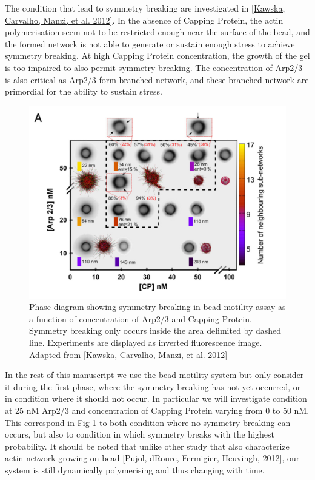 \documentclass[A4paperpaper,11pt,english]{sphinxmanual}
\begin{document}
The condition that lead to symmetry breaking are investigated in
{\hyperref[parts/part1:kawska2012]{{[}Kawska, Carvalho, Manzi,  et al.  2012{]}}}. In the absence of Capping Protein, the actin polymerisation seem
not to be restricted enough near the surface of the bead, and the formed
network is not able to generate or sustain enough stress to achieve symmetry
breaking. At high Capping Protein concentration, the growth of the gel is too impaired
to also permit symmetry breaking. The concentration of Arp2/3 is also critical
as Arp2/3 form branched network, and these branched network are primordial for the
ability to sustain stress.
\begin{figure}[htbp]
\centering
\capstart

\includegraphics[width=0.700\linewidth]{symmetry-breaking-phase-diagram.png}
\caption{Phase diagram showing symmetry breaking in bead motility assay as a
function of concentration of Arp2/3 and Capping Protein. Symmetry breaking
only occurs inside the area delimited by dashed line. Experiments are
displayed as inverted fluorescence image. Adapted from {\hyperref[parts/part1:kawska2012]{{[}Kawska, Carvalho, Manzi,  et al.  2012{]}}}}\label{parts/part1:phase-diag}\end{figure}

In the rest of this manuscript we use the bead motility system but only
consider it during the first phase, where the symmetry breaking has not yet
occurred, or in condition where it should not occur. In particular we will
investigate condition at 25 nM Arp2/3 and concentration of Capping Protein
varying from 0 to 50 nM. This correspond in \hyperref[parts/part1:phase-diag]{Fig  \ref*{parts/part1:phase-diag}} to both
condition where no symmetry breaking can occurs, but also to condition in which
symmetry breaks with the highest probability.  It should be noted that unlike
other study that also characterize actin network growing on bead
{\hyperref[parts/part1:pujol2012]{{[}Pujol, dRoure, Fermigier, Heuvingh,  2012{]}}}, our system is still dynamically polymerising and thus
changing with time.
\end{document}
